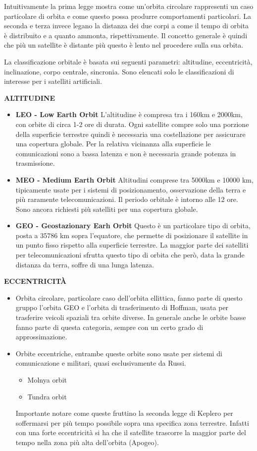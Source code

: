 \documentclass[12pt,a4paper,oneside]{book}
\begin{document}
			Intuitivamente la prima legge mostra come un'orbita circolare rappresenti un caso particolare di orbita e  come questo possa produrre comportamenti particolari. La seconda e terza invece legano la distanza dei due corpi a come il tempo di orbita è distribuito e a quanto ammonta, rispettivamente. Il concetto generale è quindi che più un satellite è distante più questo è lento nel procedere sulla sua orbita.
			
			La classificazione orbitale è basata sui seguenti parametri: altitudine, eccentricità, inclinazione, corpo centrale, sincronia. Sono elencati solo le classificazioni di interesse per i satelliti artificiali.
						
			{\large \bf ALTITUDINE}
			\begin{itemize}
				\item {\bf LEO - Low Earth Orbit}
				L'altitudine è compresa tra i 160km e 2000km, con orbite di circa 1-2 ore di durata. Ogni satellite compre solo una porzione della superficie terrestre quindi è necessaria una costellazione per assicurare una copertura globale. Per la relativa vicinanza alla superficie le comunicazioni sono a bassa latenza e non è necessaria grande potenza in trasmissione.
				\item {\bf MEO - Medium Earth Orbit}
				Altitudini comprese tra 5000km e 10000 km, tipicamente usate per i sistemi di posizionamento, osservazione della terra e più raramente telecomunicazioni. Il periodo orbitale è intorno alle 12 ore. Sono ancora richiesti più satelliti per una copertura globale.				
				\item {\bf GEO - Geostazionary Earh Orbit}
				Questo è un particolare tipo di orbita, posta a 35786 km sopra l'equatore, che permette di posizionare il satellite in un punto fisso rispetto alla superficie terrestre. La maggior parte dei satelliti per telecomunicazioni sfrutta questo tipo di orbita che però, data la grande distanza da terra, soffre di una lunga latenza.
			\end{itemize}
			
			{\large \bf ECCENTRICITÀ}	
			\begin{itemize}
				\item Orbita circolare, particolare caso dell'orbita ellittica, fanno parte di questo gruppo l'orbita GEO e l'orbita di trasferimento di Hoffman, usata per trasferire veicoli spaziali tra orbite diverse. In generale anche le orbite basse fanno parte di questa categoria, sempre con un certo grado di approssimazione.
				\item Orbite eccentriche, entrambe queste orbite sono usate per sistemi di comunicazione e militari, quasi esclusivamente da Russi. \begin{itemize}
					\item Molnya orbit
					\item Tundra orbit					
				\end{itemize}
				Importante notare come queste fruttino la seconda legge di Keplero per soffermarsi per più tempo possibile sopra una specifica zona terrestre. Infatti con una forte eccentricità si ha che il satellite trascorre la maggior parte del tempo nella zona più alta dell'orbita (Apogeo). 								
			\end{itemize}
			
\end{document}
